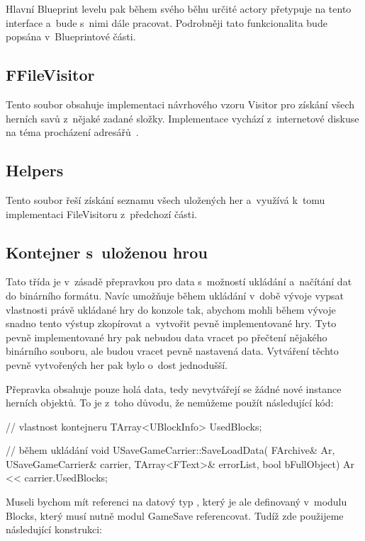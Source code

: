 Hlavní Blueprint levelu pak během svého běhu určité actory přetypuje na tento interface a~bude s~nimi dále pracovat. Podrobněji tato funkcionalita bude popsána v~Blueprintové části.

\subsection{FFileVisitor}


Tento soubor obsahuje implementaci návrhového vzoru Visitor pro získání všech herních savů z~nějaké zadané složky. Implementace vychází z~internetové diskuse na téma procházení adresářů~\citep{ue_iterate_dir}.

\subsection{Helpers}

Tento soubor řeší získání seznamu všech uložených her a~využívá k~tomu implementaci FileVisitoru z~předchozí části.

\subsection{Kontejner s~uloženou hrou}
 Tato třída je v~zásadě přepravkou pro data s~možností ukládání a~načítání dat do binárního formátu. Navíc umožňuje během ukládání v~době vývoje vypsat vlastnosti právě ukládané hry do konzole tak, abychom mohli během vývoje snadno tento výstup zkopírovat a~vytvořit pevně implementované hry. Tyto pevně implementované hry pak nebudou data vracet po přečtení nějakého binárního souboru, ale budou vracet pevně nastavená data. Vytváření těchto pevně vytvořených her pak bylo o~dost jednodušší.

Přepravka obsahuje pouze holá data, tedy nevytvářejí se žádné nové instance herních objektů. To je z~toho důvodu, že nemůžeme použít následující kód:

\begin{code}

// vlastnost kontejneru
TArray<UBlockInfo> UsedBlocks;

// během ukládání
void USaveGameCarrier::SaveLoadData(
	FArchive& Ar,
	USaveGameCarrier& carrier,
	TArray<FText>& errorList,
	bool bFullObject)
{
	Ar << carrier.UsedBlocks;
}
\end{code}
Museli bychom mít referenci na datový typ , který je ale definovaný v~modulu Blocks, který musí nutně modul GameSave referencovat. Tudíž zde použijeme následující konstrukci:

